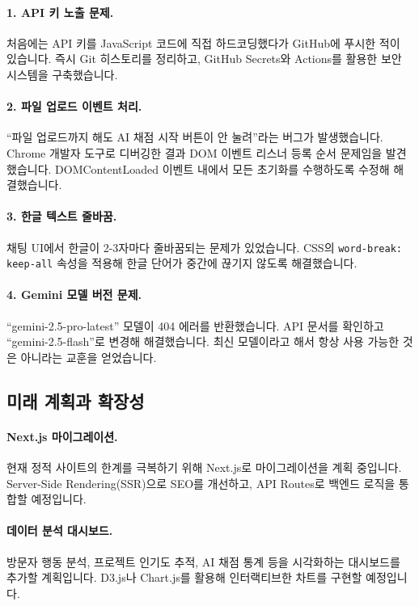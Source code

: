 \paragraph{1. API 키 노출 문제.}
처음에는 API 키를 JavaScript 코드에 직접 하드코딩했다가 GitHub에 푸시한 적이 있습니다. 즉시 Git 히스토리를 정리하고, GitHub Secrets와 Actions를 활용한 보안 시스템을 구축했습니다.

\paragraph{2. 파일 업로드 이벤트 처리.}
``파일 업로드까지 해도 AI 채점 시작 버튼이 안 눌려''라는 버그가 발생했습니다. Chrome 개발자 도구로 디버깅한 결과 DOM 이벤트 리스너 등록 순서 문제임을 발견했습니다. DOMContentLoaded 이벤트 내에서 모든 초기화를 수행하도록 수정해 해결했습니다.

\paragraph{3. 한글 텍스트 줄바꿈.}
채팅 UI에서 한글이 2-3자마다 줄바꿈되는 문제가 있었습니다. CSS의 \texttt{word-break: keep-all} 속성을 적용해 한글 단어가 중간에 끊기지 않도록 해결했습니다.

\paragraph{4. Gemini 모델 버전 문제.}
``gemini-2.5-pro-latest'' 모델이 404 에러를 반환했습니다. API 문서를 확인하고 ``gemini-2.5-flash''로 변경해 해결했습니다. 최신 모델이라고 해서 항상 사용 가능한 것은 아니라는 교훈을 얻었습니다.

\subsection{미래 계획과 확장성}

\paragraph{Next.js 마이그레이션.}
현재 정적 사이트의 한계를 극복하기 위해 Next.js로 마이그레이션을 계획 중입니다. Server-Side Rendering(SSR)으로 SEO를 개선하고, API Routes로 백엔드 로직을 통합할 예정입니다.

\paragraph{데이터 분석 대시보드.}
방문자 행동 분석, 프로젝트 인기도 추적, AI 채점 통계 등을 시각화하는 대시보드를 추가할 계획입니다. D3.js나 Chart.js를 활용해 인터랙티브한 차트를 구현할 예정입니다.

